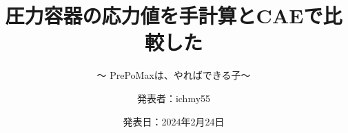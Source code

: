 %
\title{圧力容器の応力値を手計算とCAEで比較した}
\subtitle{～ PrePoMaxは、やればできる子～}
%
%
\date[2-24-2024]{発表日：2024年2月24日}
\author[ichmy55]{発表者：ichmy55}
